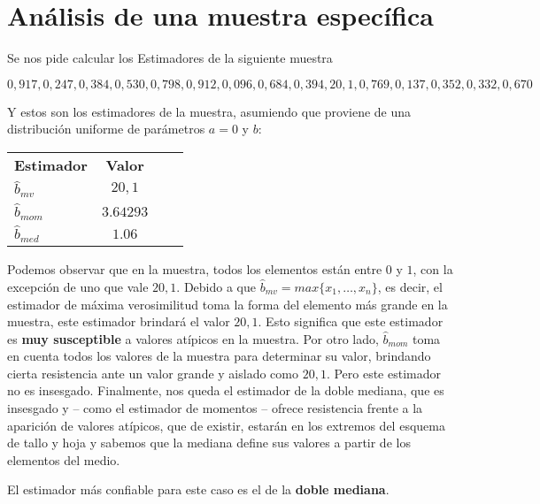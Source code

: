 \section{Análisis de una muestra específica}
Se nos pide calcular los Estimadores de la siguiente muestra

\begin{center}
$0,917, 0,247, 0,384, 0,530, 0,798, 0,912, 0,096, 0,684, 0,394, 20,1, 0,769, 0,137, 0,352, 0,332, 0,670$
\end{center}

Y estos son los estimadores de la muestra, asumiendo que proviene de una distribución uniforme de parámetros $a = 0$ y $b$:

\begin{table}[h]
	\centering
	\begin{tabular}{lccc}
		\textbf{Estimador} 	& \textbf{Valor} 	\\
		$\hat{b}_{mv}$  	& $20,1$ 			\\
		$\hat{b}_{mom}$		& $3.64293$ 		\\
		$\hat{b}_{med}$		& $1.06$
	\end{tabular}
\end{table}

Podemos observar que en la muestra, todos los elementos están entre $0$ y $1$, con la excepción de uno que vale $20,1$. Debido a que $\hat{b}_{mv} = max\{x_1, \dots, x_n\}$, es decir, el estimador de máxima verosimilitud toma la forma del elemento más grande en la muestra, este estimador brindará el valor $20,1$. Esto significa que este estimador es \textbf{muy susceptible} a valores atípicos en la muestra. Por otro lado, $\hat{b}_{mom}$ toma en cuenta todos los valores de la muestra para determinar su valor, brindando cierta resistencia ante un valor grande y aislado como $20,1$. Pero este estimador no es insesgado. Finalmente, nos queda el estimador de la doble mediana, que es insesgado y – como el estimador de momentos – ofrece resistencia frente a la aparición de valores atípicos, que de existir, estarán en los extremos del esquema de tallo y hoja y sabemos que la mediana define sus valores a partir de los elementos del medio.

\vskip 8pt

El estimador más confiable para este caso es el de la \textbf{doble mediana}.